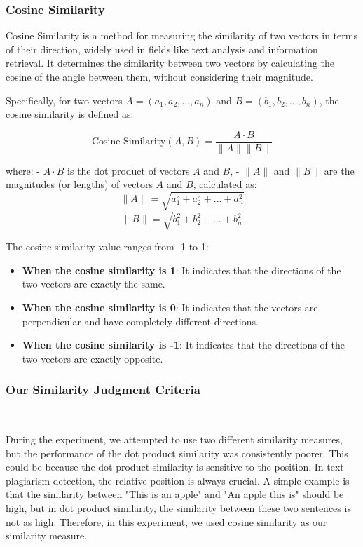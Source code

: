 \subsubsection{Cosine Similarity}
Cosine Similarity is a method for measuring the similarity of two vectors in terms of their direction, widely used in fields like text analysis and information retrieval. It determines the similarity between two vectors by calculating the cosine of the angle between them, without considering their magnitude.

Specifically, for two vectors \( A = (a_1, a_2, \dots, a_n) \) and \( B = (b_1, b_2, \dots, b_n) \), the cosine similarity is defined as:

\[
\text{Cosine Similarity}(A, B) = \frac{A \cdot B}{\|A\| \|B\|}
\]

where:
- \( A \cdot B \) is the dot product of vectors \( A \) and \( B \),
- \( \|A\| \) and \( \|B\| \) are the magnitudes (or lengths) of vectors \( A \) and \( B \), calculated as: 
  \[
  \|A\| = \sqrt{a_1^2 + a_2^2 + \dots + a_n^2}
  \]
  \[
  \|B\| = \sqrt{b_1^2 + b_2^2 + \dots + b_n^2}
  \]

The cosine similarity value ranges from -1 to 1:
\begin{itemize}
    \item \textbf{When the cosine similarity is 1}: It indicates that the directions of the two vectors are exactly the same.
    \item \textbf{When the cosine similarity is 0}: It indicates that the vectors are perpendicular and have completely different directions.
    \item \textbf{When the cosine similarity is -1}: It indicates that the directions of the two vectors are exactly opposite.
\end{itemize}

\subsubsection{Our Similarity Judgment Criteria}
\

During the experiment, we attempted to use two different similarity measures, but the performance of the dot product similarity was consistently poorer. This could be because the dot product similarity is sensitive to the position. In text plagiarism detection, the relative position is always crucial. A simple example is that the similarity between "This is an apple" and "An apple this is" should be high, but in dot product similarity, the similarity between these two sentences is not as high. Therefore, in this experiment, we used cosine similarity as our similarity measure.
\

